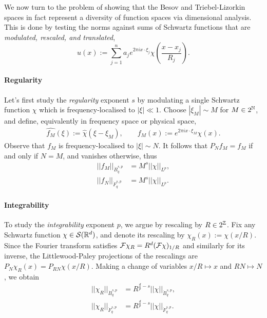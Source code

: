 We now turn to the problem of showing that the Besov and Triebel-Lizorkin spaces in fact represent a diversity of function spaces via dimensional analysis. This is done by testing the norms against sums of Schwartz functions that are \textit{modulated, rescaled, and translated},
	\[ u(x) := \sum_{j = 1}^n a_j e^{2\pi i x \cdot \xi_j} \chi(\frac{x - x_j}{R_j}).\]
\paragraph*{\textbf{Regularity}}
Let's first study the \textit{regularity} exponent $s$ by modulating a single Schwartz function $\chi$ which is frequency-localised to $|\xi| \ll 1$. Choose $|\xi_M| \sim M$ for $M \in 2^\mathbb N$, and define, equivalently in frequency space or physical space,
	\begin{align*}
		\widehat{f_M} (\xi)
			:= \widehat\chi(\xi - \xi_M)	,\qquad
		f_M (x) 
			:= e^{2\pi i x \cdot \xi_M} \chi(x).
	\end{align*}	
Observe that $f_M$ is frequency-localised to $|\xi| \sim N$. It follows that $P_N f_M = f_M$ if and only if $N = M$, and vanishes otherwise, thus 
	\begin{align*}
		 ||f_M||_{\dot B^{s, p}_q}
		 	&= M^s ||\chi||_{L^p},\\
		  ||f_N||_{\dot F^{s, p}_q}
		 	&= M^s ||\chi||_{L^p}.	
	\end{align*} 
\paragraph*{\textbf{Integrability}}
To study the \textit{integrability} exponent $p$, we argue by rescaling by $R \in 2^\mathbb Z$. Fix any Schwartz function $\chi \in \mathcal S (\mathbb R^d)$, and denote its rescaling by $\chi_R (x) := \chi(x/R)$. Since the Fourier transform satisfies $\mathcal F \chi_R = R^d (\mathcal F \chi)_{1/R}$ and similarly for its inverse, the Littlewood-Paley projections of the rescalings are $P_N \chi_R (x) = P_{R N} \chi(x/R)$. Making a change of variables $x/R \mapsto x$ and $R N \mapsto N$, we obtain 
		\begin{align*}
			||\chi_R||_{\dot B^{s, p}_q} 
				&= R^{\frac{d}{p} - s} ||\chi||_{\dot B^{s, p}_q},\\
			||\chi_R||_{\dot F^{s, p}_q} 
				&= R^{\frac{d}{p} - s} ||\chi||_{\dot F^{s, p}_q}.
		\end{align*}	
